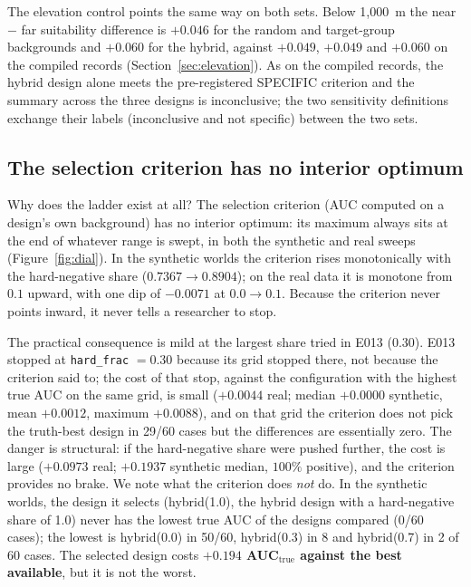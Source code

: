\documentclass[12pt]{article}
\begin{document}
The elevation control points the same way on both sets.
Below 1,000~m the near $-$ far suitability difference is $+0.046$ for the random and target-group backgrounds and $+0.060$ for the hybrid, against $+0.049$, $+0.049$ and $+0.060$ on the compiled records (Section~\ref{sec:elevation}).
As on the compiled records, the hybrid design alone meets the pre-registered SPECIFIC criterion and the summary across the three designs is inconclusive; the two sensitivity definitions exchange their labels (inconclusive and not specific) between the two sets.

\subsection{The selection criterion has no interior optimum}
\label{sec:nooptimum}

Why does the ladder exist at all?
The selection criterion (AUC computed on a design's own background) has no interior optimum: its maximum always sits at the end of whatever range is swept, in both the synthetic and real sweeps (Figure~\ref{fig:dial}).
In the synthetic worlds the criterion rises monotonically with the hard-negative share ($0.7367 \rightarrow 0.8904$); on the real data it is monotone from $0.1$ upward, with one dip of $-0.0071$ at $0.0 \rightarrow 0.1$.
Because the criterion never points inward, it never tells a researcher to stop.

The practical consequence is mild at the largest share tried in E013 (0.30).
E013 stopped at \texttt{hard\_frac} $= 0.30$ because its grid stopped there, not because the criterion said to; the cost of that stop, against the configuration with the highest true AUC on the same grid, is small ($+0.0044$ real; median $+0.0000$ synthetic, mean $+0.0012$, maximum $+0.0088$), and on that grid the criterion does not pick the truth-best design in 29/60 cases but the differences are essentially zero.
The danger is structural: if the hard-negative share were pushed further, the cost is large ($+0.0973$ real; $+0.1937$ synthetic median, $100\%$ positive), and the criterion provides no brake.
We note what the criterion does \emph{not} do. In the synthetic worlds, the design it selects (hybrid(1.0), the hybrid design with a hard-negative share of 1.0) never has the lowest true AUC of the designs compared (0/60 cases); the lowest is hybrid(0.0) in 50/60, hybrid(0.3) in 8 and hybrid(0.7) in 2 of 60 cases. The selected design costs \textbf{$+0.194$ AUC$_{\text{true}}$ against the best available}, but it is not the worst.
\end{document}
